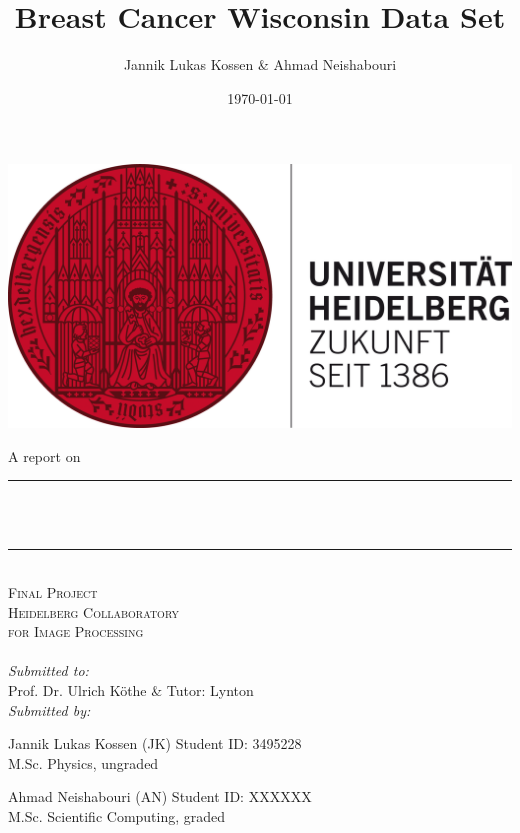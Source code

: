 \documentclass[11pt, a4paper]{scrartcl}
\title{Breast Cancer Wisconsin Data Set} %
\author{Jannik Lukas Kossen \& Ahmad Neishabouri}                               %
\date{\today}                                         %
\makeatletter
\let\thetitle\@title
\let\thedate\@date
\makeatother
\begin{document}

\begin{titlepage}
    \centering
    \includegraphics[scale = 0.6]{hdlogo}\\[2.0 cm]  %
     \begin{flushleft}
     \large  \hspace{1cm} A report on 
	\end{flushleft}      
     \centering
    \rule{\linewidth}{0.2 mm} \\[0.4 cm]
    { \huge \bfseries \thetitle}\\
    \rule{\linewidth}{0.2 mm} \\[1.5 cm]
    
    \textsc{\LARGE Final Project}\\[0.5 cm]               %
    \textsc{\Large Heidelberg Collaboratory \\[0.5em] for Image Processing}\\[2.0 cm]  %
    \thedate
   	\\[3em]
    \large
            \emph{Submitted to:}\\[1em]
            Prof. Dr. Ulrich Köthe \& Tutor: Lynton\\[1cm]
            \emph{Submitted by:} \\[1.5em]
            \begin{minipage}{0.4\textwidth}            
            	\begin{flushleft} 
					\large Jannik Lukas Kossen (JK) Student ID: 3495228 \\
					\small M.Sc. Physics, ungraded\\
      		  \end{flushleft}
      		 \end{minipage}
            \begin{minipage}{0.4\textwidth}            
            	\begin{flushright} 
    	    	    \large Ahmad Neishabouri (AN) Student ID: XXXXXX \\ 
         	   		\small M.Sc. Scientific Computing, graded
      		  \end{flushright}
      		 \end{minipage}\\[2 cm]


        
 
\end{titlepage}
\end{document}
